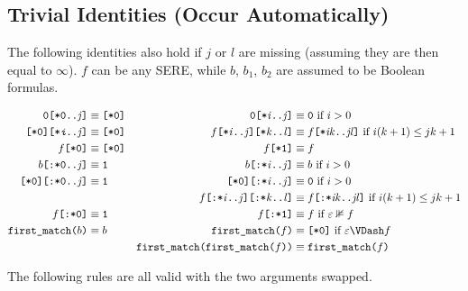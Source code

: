 \documentclass[a4paper,twoside,10pt,DIV=12]{scrreprt}
\newcommand{\FUSION}{\mathbin{\texttt{:}}}
\newcommand{\CONCAT}{\mathbin{\texttt{;}}}
\newcommand{\0}{\texttt{0}}
\newcommand{\1}{\texttt{1}}
\newcommand{\STAR}[1]{\texttt{[*#1]}}
\newcommand{\FSTAR}[1]{\texttt{[:*#1]}}
\newcommand{\FIRSTMATCH}{\texttt{first\_match}}
\newcommand{\eword}{\texttt{[*0]}}
\newcommand\var[1]{{\ttfamily\itshape #1}}
\newcommand\mvar[1]{\ensuremath{\mathit{#1}}}
\newcommand\code[1]{\texttt{#1}}
\newcommand\samp[1]{`\texttt{#1}'}
\begin{document}
\subsection{Trivial Identities (Occur Automatically)}

The following identities also hold if $j$ or $l$ are missing (assuming
they are then equal to $\infty$).  $f$ can be any SERE, while $b$,
$b_1$, $b_2$ are assumed to be Boolean formulas.

\begin{align*}
  \0\STAR{0..\mvar{j}} &\equiv \eword  &
  \0\STAR{\mvar{i}..\mvar{j}} &\equiv \0 \text{~if~}i>0 \\
  \eword\STAR{\var{i}..\mvar{j}} &\equiv \eword&
  f\STAR{\mvar{i}..\mvar{j}}\STAR{\mvar{k}..\mvar{l}} &\equiv f\STAR{\mvar{ik}..\mvar{jl}}\text{~if~}i(k+1)\le jk+1 \\
  f\STAR{0}&\equiv \eword &
  f\STAR{1}&\equiv f\\
  b\FSTAR{0..\mvar{j}} &\equiv \1  &
  b\FSTAR{\mvar{i}..\mvar{j}} &\equiv b \text{~if~}i>0 \\
  \eword\FSTAR{0..\mvar{j}} &\equiv \1&
  \eword\FSTAR{\mvar{i}..\mvar{j}} &\equiv \0\text{~if~}i>0 \\
  &&
  f\FSTAR{\mvar{i}..\mvar{j}}\FSTAR{\mvar{k}..\mvar{l}} &\equiv f\FSTAR{\mvar{ik}..\mvar{jl}}\text{~if~}i(k+1)\le jk+1 \\
  f\FSTAR{0}&\equiv \1 & f\FSTAR{1}&\equiv f\text{~if~}\varepsilon\nVDash f\\
  \FIRSTMATCH\code(b\code) &\equiv b & \FIRSTMATCH\code(f\code) &\equiv \eword\text{~if~}\varepsilon\VDash f \\
                                    && \FIRSTMATCH\code(\FIRSTMATCH\code(f\code)\code) &\equiv \FIRSTMATCH\code(f\code)
\end{align*}

\noindent
The following rules are all valid with the two arguments swapped.
\end{document}
